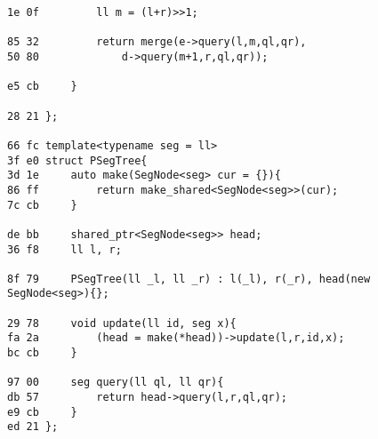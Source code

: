 \documentclass[11pt, a4paper, twoside]{article}
\begin{document}
\begin{lstlisting}
1e 0f         ll m = (l+r)>>1;
              
85 32         return merge(e->query(l,m,ql,qr),
50 80             d->query(m+1,r,ql,qr));
       
e5 cb     }
          
28 21 };
 
66 fc template<typename seg = ll>
3f e0 struct PSegTree{
3d 1e     auto make(SegNode<seg> cur = {}){
86 ff         return make_shared<SegNode<seg>>(cur);
7c cb     }
      
de bb     shared_ptr<SegNode<seg>> head;
36 f8     ll l, r;
       
8f 79     PSegTree(ll _l, ll _r) : l(_l), r(_r), head(new SegNode<seg>){};
       
29 78     void update(ll id, seg x){
fa 2a         (head = make(*head))->update(l,r,id,x);
bc cb     }
       
97 00     seg query(ll ql, ll qr){
db 57         return head->query(l,r,ql,qr);
e9 cb     }
ed 21 };
\end{lstlisting}
\end{document}
